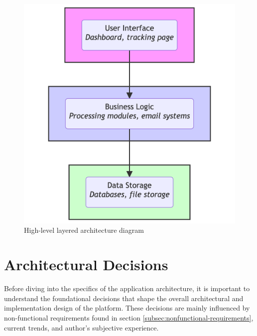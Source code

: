 \begin{figure}[p]\centering
\includegraphics[width=140mm]{img/chap03/fig_layered_architecture_mermaid.png}
\caption{High-level layered architecture diagram}
\label{img03:layered_architecture_diagram}
\end{figure}






\section{Architectural Decisions}
\label{sec:architectural-decisions}
Before diving into the specifics of the application architecture, it is important to understand the foundational decisions that shape the overall architectural and implementation design of the platform.
These decisions are mainly influenced by non-functional requirements found in section \ref{subsec:nonfunctional-requirements}, current trends, and author's subjective experience.

